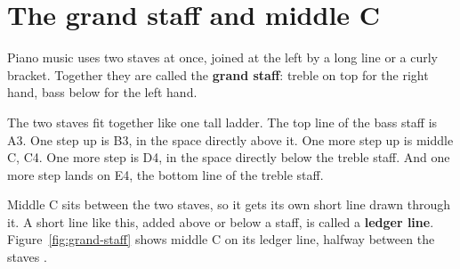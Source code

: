 \section{The grand staff and middle C}

Piano music uses two staves at once, joined at the left by a long line or a curly bracket. Together they are called the \textbf{grand staff}: treble on top for the right hand, bass below for the left hand.

The two staves fit together like one tall ladder. The top line of the bass staff is A3. One step up is B3, in the space directly above it. One more step up is middle C, C4. One more step is D4, in the space directly below the treble staff. And one more step lands on E4, the bottom line of the treble staff.

Middle C sits between the two staves, so it gets its own short line drawn through it. A short line like this, added above or below a staff, is called a \textbf{ledger line}. Figure~\ref{fig:grand-staff} shows middle C on its ledger line, halfway between the staves .


